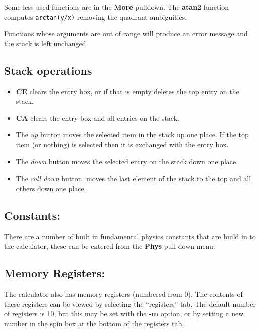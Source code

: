 \documentclass{article}
\begin{document}
  Some less-used functions are in the \textbf{More} pulldown. The
  \textbf{atan2} function computes \texttt{arctan(y/x)} removing the
  quadrant ambiguities.

  Functions whose arguments are out of range will produce an error
  message and the stack is left unchanged.

  \subsection{Stack operations}

  \begin{itemize}
  \item \textbf{CE} clears the entry box, or if that is empty deletes
    the top entry on the stack.

  \item \textbf{CA} clears the entry box and all entries on the stack.

  \item The \emph{up} button moves the selected item in the stack up
    one place. If the top item (or nothing) is selected then it is
    exchanged with the entry box.

  \item The \emph{down} button moves the selected entry on the stack
    down one place.

  \item The \emph{roll down} button, moves the last element of the
    stack to the top and all others down one place.
  \end{itemize}

  \subsection{Constants:}

  There are a number of built in fundamental physics constants that are
  build in to the calculator, these can be entered from the
  \textbf{Phys} pull-down menu.

  \subsection{Memory Registers:}

  The calculator also has memory registers (numbered from 0). The
  contents of these registers can be viewed by selecting the
  ``registers'' tab. The default number of registers is 10, but this
  may be set with the \textbf{-m} option, or by setting a new number in
  the spin box at the bottom of the registers tab.
\end{document}
